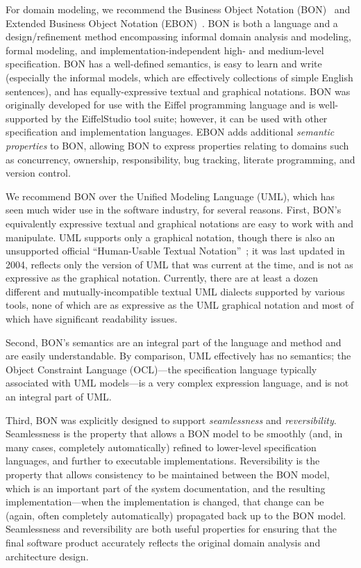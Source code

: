 For domain modeling, we recommend the Business Object Notation
(BON)~\cite{walden1995seamless} and Extended Business Object Notation
(EBON)~. BON is both a language and a design/refinement method
encompassing informal domain analysis and modeling, formal modeling,
and implementation-independent high- and medium-level
specification. BON has a well-defined semantics, is easy to learn and
write (especially the informal models, which are effectively
collections of simple English sentences), and has equally-expressive
textual and graphical notations. BON was originally developed for use
with the Eiffel programming language and is well-supported by the
EiffelStudio tool suite; however, it can be used with other
specification and implementation languages. EBON adds additional
\emph{semantic properties} to BON, allowing BON to express properties
relating to domains such as concurrency, ownership, responsibility,
bug tracking, literate programming, and version control.

We recommend BON over the Unified Modeling Language (UML), which has
seen much wider use in the software industry, for several
reasons. First, BON's equivalently expressive textual and graphical
notations are easy to work with and manipulate. UML supports only a
graphical notation, though there is also an unsupported official
``Human-Usable Textual Notation''~\cite{HUTN}; it was last updated in
2004, reflects only the version of UML that was current at the time,
and is not as expressive as the graphical notation. Currently, there
are at least a dozen different and mutually-incompatible textual UML
dialects supported by various tools, none of which are as expressive
as the UML graphical notation and most of which have significant
readability issues.

Second, BON's semantics are an integral part of the language and
method and are easily understandable. By comparison, UML effectively
has no semantics; the Object Constraint Language (OCL)---the
specification language typically associated with UML models---is a
very complex expression language, and is not an integral part of UML.

Third, BON was explicitly designed to support \emph{seamlessness} and
\emph{reversibility}. Seamlessness is the property that allows a BON
model to be smoothly (and, in many cases, completely automatically)
refined to lower-level specification languages, and further to
executable implementations. Reversibility is the property that allows
consistency to be maintained between the BON model, which is an
important part of the system documentation, and the resulting
implementation---when the implementation is changed, that change can
be (again, often completely automatically) propagated back up to the
BON model. Seamlessness and reversibility are both useful properties
for ensuring that the final software product accurately reflects the
original domain analysis and architecture design.

